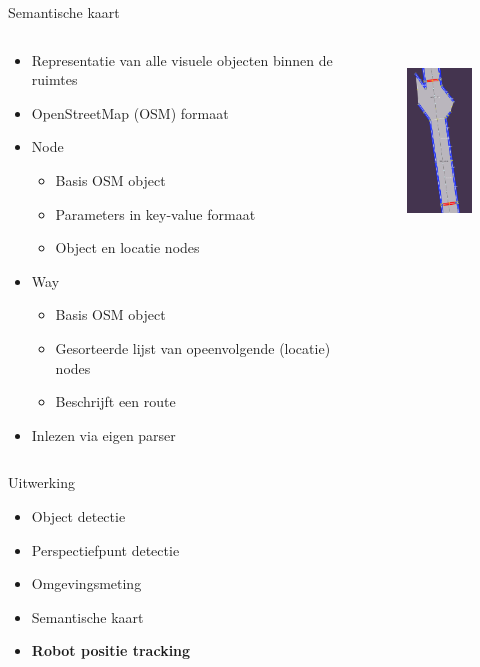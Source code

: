 \documentclass[11pt,t]{beamer}
\begin{document}
\begin{frame}[fragile]{Semantische kaart}
	\begin{columns}[t]
		\begin{column}{.7\textwidth}
			\begin{itemize}
				\item Representatie van alle visuele objecten binnen de ruimtes
				\item OpenStreetMap (OSM) formaat
				\item Node
				\begin{itemize}
					\item Basis OSM object
					\item Parameters in key-value formaat
					\item Object en locatie nodes
				\end{itemize}

				\item Way
				\begin{itemize}
					\item Basis OSM object
					\item Gesorteerde lijst van opeenvolgende (locatie) nodes
					\item Beschrijft een route
				\end{itemize}

				\item Inlezen via eigen parser
			\end{itemize}
		\end{column}
		\begin{column}{.3\textwidth}
			\begin{figure}
				\centering
				\includegraphics[height=180px]{graphics/kaart.png}
			\end{figure}
		\end{column}
	\end{columns}	
\end{frame}

%
%
\begin{frame}[fragile]{Uitwerking}
	\begin{itemize}
		\item Object detectie
		\item Perspectiefpunt detectie
		\item Omgevingsmeting
		\item Semantische kaart
		\item \textbf{Robot positie tracking}
	\end{itemize}
\end{frame}
\end{document}
